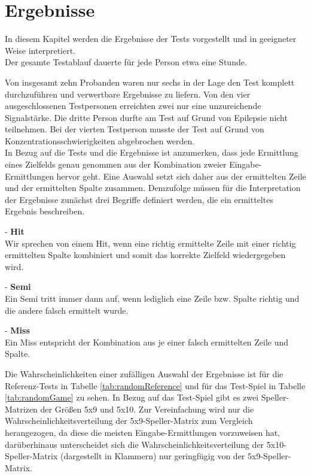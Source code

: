 \chapter{Ergebnisse}

In diesem Kapitel werden die Ergebnisse der Tests vorgestellt und in geeigneter Weise interpretiert.\\
Der gesamte Testablauf dauerte für jede Person etwa eine Stunde. 

Von insgesamt zehn Probanden waren nur sechs in der Lage den Test komplett durchzuführen und verwertbare Ergebnisse zu liefern.
Von den vier ausgeschlossenen Testpersonen erreichten zwei nur eine unzureichende Signalstärke.
Die dritte Person durfte am Test auf Grund von Epilepsie nicht teilnehmen.
Bei der vierten Testperson musste der Test auf Grund von Konzentrationsschwierigkeiten abgebrochen werden.\\



In Bezug auf die Tests und die Ergebnisse ist anzumerken, dass jede Ermittlung eines Zielfelds genau genommen aus der Kombination zweier Eingabe-Ermittlungen hervor geht.
Eine Auswahl setzt sich daher aus der ermittelten Zeile und der ermittelten Spalte zusammen.
Demzufolge müssen für die Interpretation der Ergebnisse zunächst drei Begriffe definiert werden, die ein ermitteltes Ergebnis beschreiben.

 \begin{Def} - \textbf{Hit} \\
 Wir sprechen von einem Hit, wenn eine richtig ermittelte Zeile mit einer richtig ermittelten Spalte kombiniert und somit das korrekte Zielfeld wiedergegeben wird.
 \end{Def}
 \begin{Def} - \textbf{Semi} \\
 Ein Semi tritt immer dann auf, wenn lediglich eine Zeile bzw. Spalte richtig und die andere falsch ermittelt wurde.
 \end{Def} 
 \begin{Def} - \textbf{Miss} \\
Ein Miss entspricht der Kombination aus je einer falsch ermittelten Zeile und Spalte.\\
 \end{Def}

 
Die Wahrscheinlichkeiten einer zufälligen Auswahl der Ergebnisse ist für die Referenz-Tests in Tabelle \ref{tab:randomReference} und für das Test-Spiel in Tabelle \ref{tab:randomGame} zu sehen.
In Bezug auf das Test-Spiel gibt es zwei Speller-Matrizen der Größen 5x9 und 5x10.
Zur Vereinfachung wird nur die Wahrscheinlichkeitsverteilung der 5x9-Speller-Matrix zum Vergleich herangezogen, 
da diese die meisten Eingabe-Ermittlungen vorzuweisen hat, darüberhinaus unterscheidet sich die Wahrscheinlichkeitsverteilung der 5x10-Speller-Matrix (dargestellt in Klammern) nur geringfügig von der 5x9-Speller-Matrix.


